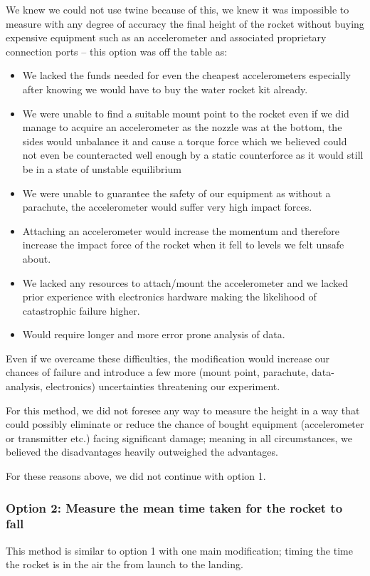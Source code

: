 \documentclass[14pt]{article}
\begin{document}
We knew we could not use twine because of this, we knew it was impossible to measure with any degree of accuracy the final height of the rocket without buying expensive equipment such as an accelerometer and associated proprietary connection ports -- this option was off the table as:
\begin{itemize}
    \item We lacked the funds needed for even the cheapest accelerometers especially after knowing we would have to buy the water rocket kit already.
    \item We were unable to find a suitable mount point to the rocket even if we did manage to acquire an accelerometer as the nozzle was at the bottom, the sides would unbalance it and cause a torque force which we believed could not even be counteracted well enough by a static counterforce as it would still be in a state of unstable equilibrium
    \item We were unable to guarantee the safety of our equipment as without a parachute, the accelerometer would suffer very high impact forces. 
    \item Attaching an accelerometer would increase the momentum and therefore increase the impact force of the rocket when it fell to levels we felt unsafe about.
    \item We lacked any resources to attach/mount the accelerometer and we lacked prior experience with electronics hardware making the likelihood of catastrophic failure higher.
    \item Would require longer and more error prone analysis of data.

\end{itemize}
Even if we overcame these difficulties, the modification would increase our chances of failure and introduce a few more (mount point, parachute, data-analysis, electronics) uncertainties threatening our experiment. 

For this method, we did not foresee any way to measure the height in a way that could possibly eliminate or reduce the chance of bought equipment (accelerometer or transmitter etc.) facing significant damage; meaning in all circumstances, we believed the disadvantages heavily outweighed the advantages. 

For these reasons above, we did not continue with option 1.
\subsubsection{Option 2: Measure the mean time taken for the rocket to fall}
This method is similar to option 1 with one main modification; timing the time the rocket is in the air the from launch to the landing.
\end{document}
